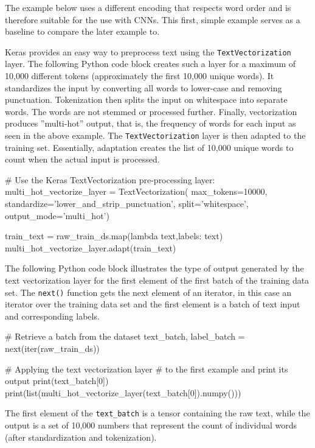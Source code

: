 \begin{withcode}
The example below uses a different encoding that respects word order and is therefore suitable for the use with CNNs. This first, simple example serves as a baseline to compare the later example to.

Keras provides an easy way to preprocess text using the \texttt{TextVectorization} layer. The following Python code block creates such a layer for a maximum of 10,000 different tokens (approximately the first 10,000 unique words). It standardizes the input by converting all words to lower-case and removing punctuation. Tokenization then splits the input on whitespace into separate words. The words are not stemmed or processed further. Finally, vectorization produces ''multi-hot'' output, that is, the frequency of words for each input as seen in the above example. The \texttt{TextVectorization} layer is then adapted to the training set. Essentially, adaptation creates the list of 10,000 unique words to count when the actual input is processed.

\begin{pythoncode}
# Use the Keras TextVectorization pre-processing layer:
multi_hot_vectorize_layer = TextVectorization(
    max_tokens=10000,
    standardize='lower_and_strip_punctuation',
    split='whitespace',
    output_mode='multi_hot')
    
train_text = raw_train_ds.map(lambda text,labels: text)
multi_hot_vectorize_layer.adapt(train_text)
\end{pythoncode}

The following Python code block illustrates the type of output generated by the text vectorization layer for the first element of the first batch of the training data set. The \texttt{next()} function gets the next element of an iterator, in this case an iterator over the training data set and the first element is a batch of text input and corresponding labels.

\begin{pythoncode}
# Retrieve a batch from the dataset
text_batch, label_batch = next(iter(raw_train_ds))

# Applying the text vectorization layer
# to the first example and print its output
print(text_batch[0])
print(list(multi_hot_vectorize_layer(text_batch[0]).numpy()))
\end{pythoncode}

The first element of the \texttt{text\_batch} is a tensor containing the raw text, while the output is a set of 10,000 numbers that represent the count of individual words (after standardization and tokenization).


\end{withcode}
